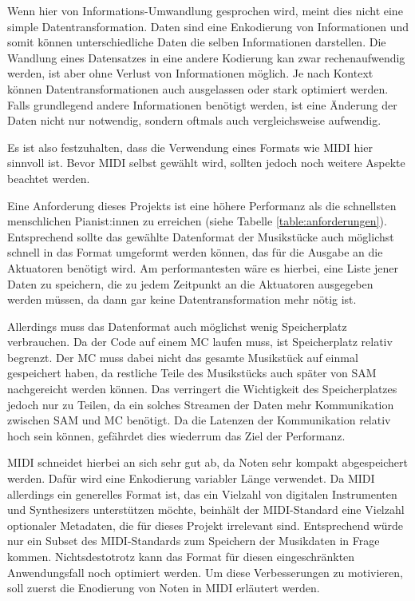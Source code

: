 Wenn hier von Informations-Umwandlung gesprochen wird, meint dies nicht eine simple Datentransformation.
Daten sind eine Enkodierung von Informationen und somit können unterschiedliche Daten die selben Informationen darstellen.
Die Wandlung eines Datensatzes in eine andere Kodierung kan zwar rechenaufwendig werden, ist aber ohne Verlust von Informationen möglich.
Je nach Kontext können Datentransformationen auch ausgelassen oder stark optimiert werden.
Falls grundlegend andere Informationen benötigt werden, ist eine Änderung der Daten nicht nur notwendig, sondern oftmals auch vergleichsweise aufwendig.

Es ist also festzuhalten, dass die Verwendung eines Formats wie \ac{MIDI} hier sinnvoll ist.
Bevor \ac{MIDI} selbst gewählt wird, sollten jedoch noch weitere Aspekte beachtet werden.

Eine Anforderung dieses Projekts ist eine höhere Performanz als die schnellsten menschlichen Pianist:innen zu erreichen (siehe Tabelle \ref{table:anforderungen}).
Entsprechend sollte das gewählte Datenformat der Musikstücke auch möglichst schnell in das Format umgeformt werden können, das für die Ausgabe an die Aktuatoren benötigt wird.
Am performantesten wäre es hierbei, eine Liste jener Daten zu speichern, die zu jedem Zeitpunkt an die Aktuatoren ausgegeben werden müssen, da dann gar keine Datentransformation mehr nötig ist.

Allerdings muss das Datenformat auch möglichst wenig Speicherplatz verbrauchen.
Da der Code auf einem \ac{MC} laufen muss, ist Speicherplatz relativ begrenzt.
Der \ac{MC} muss dabei nicht das gesamte Musikstück auf einmal gespeichert haben, da restliche Teile des Musikstücks auch später von \ac{SAM} nachgereicht werden können.
Das verringert die Wichtigkeit des Speicherplatzes jedoch nur zu Teilen, da ein solches Streamen der Daten mehr Kommunikation zwischen \ac{SAM} und {MC} benötigt.
Da die Latenzen der Kommunikation relativ hoch sein können, gefährdet dies wiederrum das Ziel der Performanz.

\ac{MIDI} schneidet hierbei an sich sehr gut ab, da Noten sehr kompakt abgespeichert werden.
Dafür wird eine Enkodierung variabler Länge verwendet.
Da \ac{MIDI} allerdings ein generelles Format ist, das ein Vielzahl von digitalen Instrumenten und Synthesizers unterstützen möchte, beinhält der \ac{MIDI}-Standard eine Vielzahl optionaler Metadaten, die für dieses Projekt irrelevant sind.
Entsprechend würde nur ein Subset des \ac{MIDI}-Standards zum Speichern der Musikdaten in Frage kommen.
Nichtsdestotrotz kann das Format für diesen eingeschränkten Anwendungsfall noch optimiert werden.
Um diese Verbesserungen zu motivieren, soll zuerst die Enodierung von Noten in \ac{MIDI} erläutert werden.

